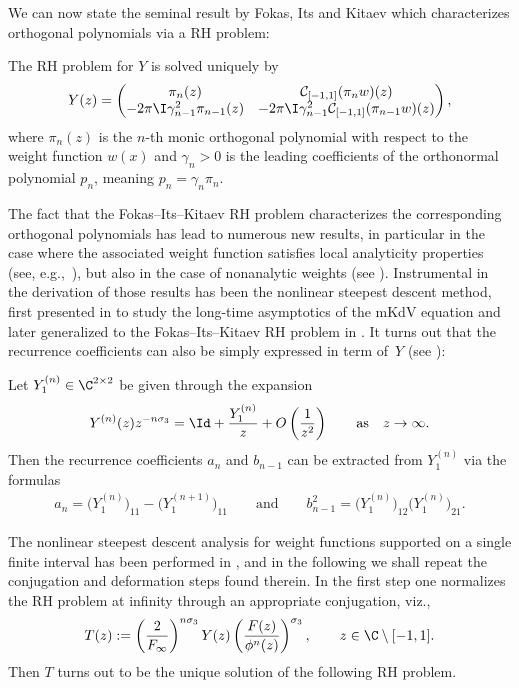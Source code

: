 We can now state the seminal result by Fokas, Its and Kitaev which characterizes orthogonal polynomials via a RH problem:
\begin{Theorem}
The RH problem for $Y$ is solved uniquely by
\begin{align*}
Y(z) =
\begin{pmatrix}
\pi_n(z) & \mathcal{C}_{[-1,1]}(\pi_n w)(z)
\\
-2\pi\I\gamma^2_{n-1} \pi_{n-1}(z) & -2\pi\I\gamma^2_{n-1} \mathcal{C}_{[-1,1]}(\pi_{n-1} w)(z)
\end{pmatrix},
\end{align*}
where $\pi_n(z)$ is the $n$-th monic orthogonal polynomial with respect to the weight function $w(x)$ and $\gamma_n > 0$ is the leading coefficients of the orthonormal polynomial $p_n$, meaning $p_n = \gamma_n \pi_n$.
\end{Theorem}

The fact that the Fokas--Its--Kitaev RH problem characterizes the corresponding orthogonal polynomials has lead to numerous new results, in particular in the case where the associated weight function satisfies local analyticity properties (see, e.g.,~\cite{BI,PD,DKMVZ1,DKMVZ2,KMVV}), but also in the case of nonanalytic weights (see \cite{BY10,KMcL99,McM06,McM08,MY23}). Instrumental in the derivation of those results has been the nonlinear steepest descent method, first presented in \cite{DZ93} to study the long-time asymptotics of the mKdV equation and later generalized to the Fokas--Its--Kitaev RH problem in \cite{BI,DKMVZ1,DKMVZ2}. It turns out that the recurrence coefficients can also be simply expressed in term of~$Y$ (see \cite{PD}):
\begin{Proposition}\label{Yab}
 Let $Y_1^{(n)} \in \C^{2\times2}$ be given through the expansion
 \begin{align*}
 Y^{(n)}(z)z^{-n\sigma_3} = \Id + \frac{Y_1^{(n)}}{z} + O\left(\frac{1}{z^2}\right) \qquad \text{as} \quad z\to\infty.
 \end{align*}
Then the recurrence coefficients $a_n$ and $b_{n-1}$ can be extracted from $Y_1^{(n)}$ via the formulas
\begin{align*}
 a_n = \big(Y_1^{(n)}\big)_{11}-\big(Y_1^{(n+1)}\big)_{11}
\qquad \text{and}\qquad b_{n-1}^2 = \big(Y_1^{(n)}\big)_{12} \big(Y_1^{(n)}\big)_{21}.
\end{align*}
\end{Proposition}

The nonlinear steepest descent analysis for weight functions supported on a single finite interval has been performed in \cite{KMVV}, and in the following we shall repeat the conjugation and deformation steps found therein. In the first step one normalizes the RH problem at infinity through an appropriate conjugation, viz.,
\begin{align} \label{TY}
 T(z) := \left(\frac{2}{F_\infty}\right)^{n\sigma_3} Y(z) \left(\frac{F(z)}{\phi^n(z)}\right)^{\sigma_3}, \qquad z \in \C \setminus [-1,1].
\end{align}
Then $T$ turns out to be the unique solution of the following RH problem.

